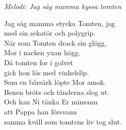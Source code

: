 {\footnotesize\textit{Melodi: Jag såg mamma kyssa tomten}}\par
\vspace{10pt}
Jag såg mamma stycka Tomten, jag\\
med sin sekatör och polygrip.\\
När som Tomten drack sin glögg,\\
Mor i nacken yxan högg.\\
Då tomten for i golvet \\
gick hon lös med vinkelslip.\\
Som en bärsärk löpte Mor amok.\\
Benen bröts och tänderna slog ut.\\
Och kan Ni tänka Er minsann\\
att Pappa han försvann\\
samma kväll som tomtens liv tog slut.
